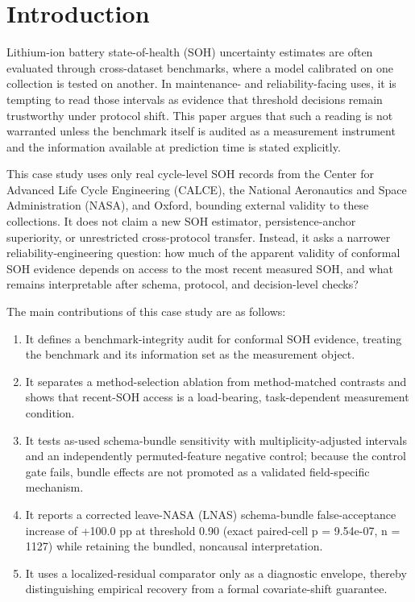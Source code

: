 \documentclass[
  number,
  preprint]{elsarticle}
\providecommand{\tightlist}{%
  \setlength{\itemsep}{0pt}\setlength{\parskip}{0pt}}
\begin{document}
\section{Introduction}\label{introduction}

Lithium-ion battery state-of-health (SOH) uncertainty estimates are
often evaluated through cross-dataset benchmarks, where a model
calibrated on one collection is tested on another. In maintenance- and
reliability-facing uses, it is tempting to read those intervals as
evidence that threshold decisions remain trustworthy under protocol
shift. This paper argues that such a reading is not warranted unless the
benchmark itself is audited as a measurement instrument and the
information available at prediction time is stated explicitly.

This case study uses only real cycle-level SOH records from the Center
for Advanced Life Cycle Engineering (CALCE), the National Aeronautics
and Space Administration (NASA), and Oxford, bounding external validity
to these collections. It does not claim a new SOH estimator,
persistence-anchor superiority, or unrestricted cross-protocol transfer.
Instead, it asks a narrower reliability-engineering question: how much
of the apparent validity of conformal SOH evidence depends on access to
the most recent measured SOH, and what remains interpretable after
schema, protocol, and decision-level checks?

The main contributions of this case study are as follows:

\begin{enumerate}
\def\labelenumi{\arabic{enumi}.}
\tightlist
\item
  It defines a benchmark-integrity audit for conformal SOH evidence,
  treating the benchmark and its information set as the measurement
  object.
\item
  It separates a method-selection ablation from method-matched contrasts
  and shows that recent-SOH access is a load-bearing, task-dependent
  measurement condition.
\item
  It tests as-used schema-bundle sensitivity with multiplicity-adjusted
  intervals and an independently permuted-feature negative control;
  because the control gate fails, bundle effects are not promoted as a
  validated field-specific mechanism.
\item
  It reports a corrected leave-NASA (LNAS) schema-bundle
  false-acceptance increase of +100.0 pp at threshold 0.90 (exact
  paired-cell p = 9.54e-07, n = 1127) while retaining the bundled,
  noncausal interpretation.
\item
  It uses a localized-residual comparator only as a diagnostic envelope,
  thereby distinguishing empirical recovery from a formal
  covariate-shift guarantee.
\end{enumerate}
\end{document}
